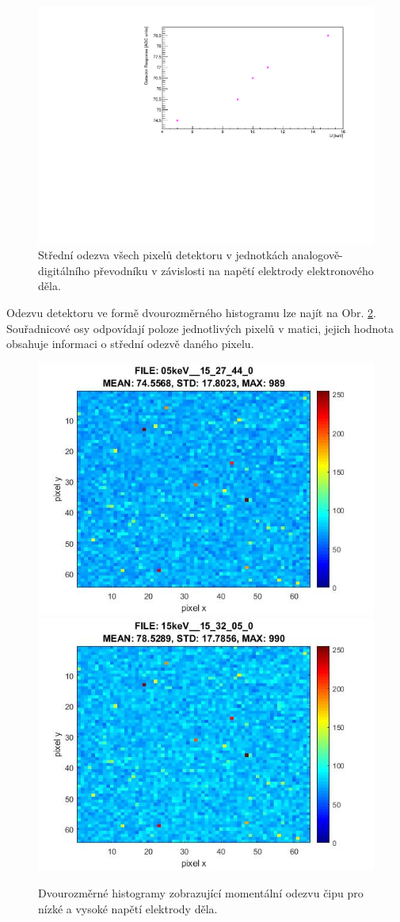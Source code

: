 \begin{figure}[htbp!]
\centering
\includegraphics[scale = 0.7]{Figure/response.pdf}
 \caption{Střední odezva všech pixelů detektoru v jednotkách analogově-digitálního převodníku v závislosti na napětí elektrody elektronového děla.}
\label{Obrazek_threshold}
\end{figure}

Odezvu detektoru ve formě dvourozměrného histogramu lze najít na Obr. \ref{Obrazek_histo}. Souřadnicové osy odpovídají poloze jednotlivých pixelů v matici, jejich hodnota obsahuje informaci o střední odezvě daného pixelu.


\begin{figure}[htbp!]
\centering
\includegraphics[width = 200 pt]{Figure/100_05keV__15_27_44_0.jpg}
\hfill
\includegraphics[width = 200 pt]{Figure/100_15keV__15_32_05_0.jpg}
 \caption{Dvourozměrné histogramy zobrazující momentální odezvu čipu pro nízké a vysoké napětí elektrody děla.}
\label{Obrazek_histo}
\end{figure}

